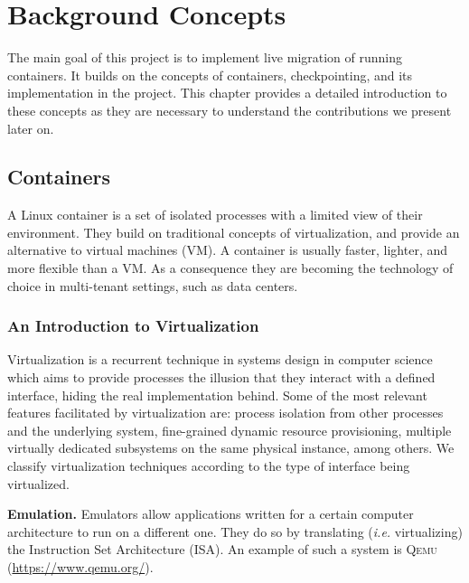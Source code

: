 \chapter{Background Concepts} \label{chap:background}

The main goal of this project is to implement live migration of running containers.
It builds on the concepts of containers, checkpointing, and its implementation in the \criu project.
This chapter provides a detailed introduction to these concepts as they are necessary to understand the contributions we present later on.

\section{Containers} \label{sec:containers}

A Linux container is a set of isolated processes with a limited view of their environment.
They build on traditional concepts of virtualization, and provide an alternative to virtual machines (VM).
A container is usually faster, lighter, and more flexible than a VM.
As a consequence they are becoming the technology of choice in multi-tenant settings, such as data centers.

\subsection{An Introduction to Virtualization}

Virtualization is a recurrent technique in systems design in computer science which aims to provide processes the illusion that they interact with a defined interface, hiding the real implementation behind.
Some of the most relevant features facilitated by virtualization are: process isolation from other processes and the underlying system, fine-grained dynamic resource provisioning, multiple virtually dedicated subsystems on the same physical instance, among others.
We classify virtualization techniques according to the type of interface being virtualized.

\textbf{Emulation.}
Emulators allow applications written for a certain computer architecture to run on a different one.
They do so by translating (\textit{i.e.} virtualizing) the Instruction Set Architecture (ISA).
An example of such a system is \textsc{Qemu} (\url{https://www.qemu.org/}).

